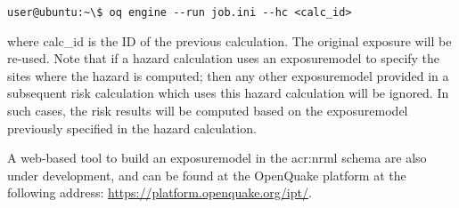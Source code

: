 \begin{verbatim}
user@ubuntu:~\$ oq engine --run job.ini --hc <calc_id>
\end{verbatim}

where calc\_id is the ID of the previous calculation. The original exposure
will be re-used. Note that if a hazard calculation uses an \gls{exposuremodel}
to specify the sites where the hazard is computed; then any other
\gls{exposuremodel} provided in a subsequent risk calculation which uses this
hazard calculation will be  ignored. In such cases, the risk results will be
computed based on the \gls{exposuremodel} previously specified in the hazard
calculation.



A web-based tool to build an \gls{exposuremodel} in the \gls{acr:nrml} schema
are also under development, and can be found at the OpenQuake platform at the
following address: \href{https://platform.openquake.org/ipt/}{https://platform.openquake.org/ipt/}.
